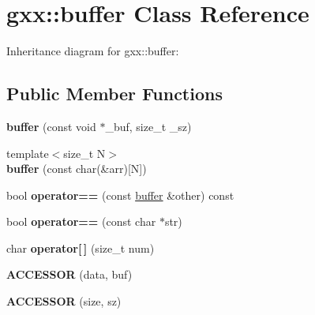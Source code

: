 \hypertarget{classgxx_1_1buffer}{}\section{gxx\+:\+:buffer Class Reference}
\label{classgxx_1_1buffer}


Inheritance diagram for gxx\+:\+:buffer\+:
\subsection*{Public Member Functions}
\begin{DoxyCompactItemize}
\item 
{\bfseries buffer} (const void $\ast$\+\_\+buf, size\+\_\+t \+\_\+sz)\hypertarget{classgxx_1_1buffer_ab50e6857985ce25bc482ac4a915adf54}{}\label{classgxx_1_1buffer_ab50e6857985ce25bc482ac4a915adf54}

\item 
{\footnotesize template$<$size\+\_\+t N$>$ }\\{\bfseries buffer} (const char(\&arr)\mbox{[}N\mbox{]})\hypertarget{classgxx_1_1buffer_ade202d73586e409e1ab396c87122eeba}{}\label{classgxx_1_1buffer_ade202d73586e409e1ab396c87122eeba}

\item 
bool {\bfseries operator==} (const \hyperlink{classgxx_1_1buffer}{buffer} \&other) const \hypertarget{classgxx_1_1buffer_a300eb1e67de3904c7c88535521b8f9b1}{}\label{classgxx_1_1buffer_a300eb1e67de3904c7c88535521b8f9b1}

\item 
bool {\bfseries operator==} (const char $\ast$str)\hypertarget{classgxx_1_1buffer_a49845b11c97de6da87ed93364a07ef7a}{}\label{classgxx_1_1buffer_a49845b11c97de6da87ed93364a07ef7a}

\item 
char {\bfseries operator\mbox{[}$\,$\mbox{]}} (size\+\_\+t num)\hypertarget{classgxx_1_1buffer_a6b7b7877670efae896cbafa492873562}{}\label{classgxx_1_1buffer_a6b7b7877670efae896cbafa492873562}

\item 
{\bfseries A\+C\+C\+E\+S\+S\+OR} (data, buf)\hypertarget{classgxx_1_1buffer_a9beea8552a484e2605ce1fb94795fcf2}{}\label{classgxx_1_1buffer_a9beea8552a484e2605ce1fb94795fcf2}

\item 
{\bfseries A\+C\+C\+E\+S\+S\+OR} (size, sz)\hypertarget{classgxx_1_1buffer_a0ff37a6b6eab992deaaaf1a4e14bdc90}{}\label{classgxx_1_1buffer_a0ff37a6b6eab992deaaaf1a4e14bdc90}


\end{DoxyCompactItemize}
